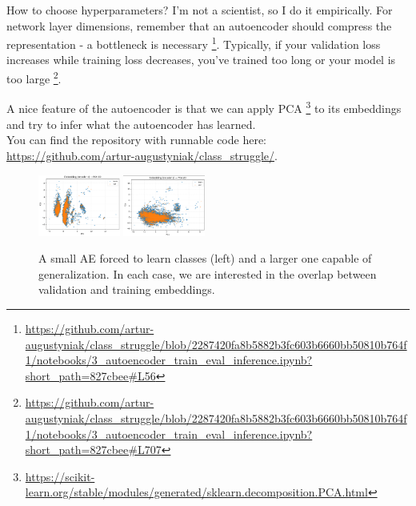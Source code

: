 \documentclass[twocolumn,9pt]{extarticle}
\begin{document}
How to choose hyperparameters? I'm not a scientist, so I do it empirically. 
For network layer dimensions, remember that an autoencoder should compress the representation - a bottleneck is necessary \footnote{\url{https://github.com/artur-augustyniak/class_struggle/blob/2287420fa8b5882b3fc603b6660bb50810b764f1/notebooks/3_autoencoder_train_eval_inference.ipynb?short_path=827cbee\#L56}}.
Typically, if your validation loss increases while training loss decreases, you’ve trained too long or your model is too large \footnote{\url{https://github.com/artur-augustyniak/class_struggle/blob/2287420fa8b5882b3fc603b6660bb50810b764f1/notebooks/3_autoencoder_train_eval_inference.ipynb?short_path=827cbee\#L707}}.

A nice feature of the autoencoder is that we can apply PCA \footnote{\url{https://scikit-learn.org/stable/modules/generated/sklearn.decomposition.PCA.html}} to its embeddings 
and try to infer what the autoencoder has learned.\\You can find the repository with runnable code here:\\\url{https://github.com/artur-augustyniak/class_struggle/}.

\vspace{-9pt}
\begin{figure}[h!]
    \includegraphics[width=0.24\textwidth]{img/small_ae.png}
    \includegraphics[width=0.24\textwidth]{img/big_ae.png}
    \caption{A small AE forced to learn classes (left) and a larger one capable of generalization. In each case, we are interested in the overlap between validation and training embeddings.}
\end{figure}
\vspace{-6pt}
\end{document}
